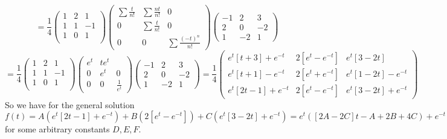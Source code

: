 \[ 
= \frac{1}{4}\begin{pmatrix}
1&2&1\\
1&1&-1\\
1&0&1\\
\end{pmatrix}\begin{pmatrix}
\sum \frac{t}{n!}&\sum \frac{nt}{n!}&0\\
0&\sum \frac{t}{n!}&0\\
0&0&\sum \frac{(-t)^n}{n!}
\end{pmatrix}\begin{pmatrix}
-1&2&3\\
2&0&-2\\
1&-2&1
\end{pmatrix}
\]\[= \frac{1}{4}\begin{pmatrix}
1&2&1\\
1&1&-1\\
1&0&1\\
\end{pmatrix}\begin{pmatrix}
e^t &te^t\\
0&e^t&0\\
0&0&\frac{1}{e^t}
\end{pmatrix}\begin{pmatrix}
-1&2&3\\
2&0&-2\\
1&-2&1
\end{pmatrix}
= \frac{1}{4} \begin{pmatrix}
e^t \left[t+3\right] + e^{-t} & 2\left[e^t-e^{-t}\right]&e^t\left[3-2t\right]\\
e^t\left[t+1\right]-e^{-t} & 2\left[e^t+e^{-t}\right] & e^t \left[1-2t\right]-e^{-t}\\
e^{t}\left[2t-1\right]+e^{-t}&2\left[e^t-e^{-t}\right]&e^t\left[3-2t\right]+e^{-t}
\end{pmatrix}
\]
So we have for the general solution $f(t) = A\left(e^{t}\left[2t-1\right]+e^{-t}\right)+B\left(2\left[e^t-e^{-t}\right]\right)+C\left(e^t\left[3-2t\right]+e^{-t}\right)
= e^{t}([2A-2C]t - A + 2B + 4C) + e^{-t}[A-B+C] =
Dte^t + Ee^t + Fe^{-t}
$ for some arbitrary constants $D,E,F$.

